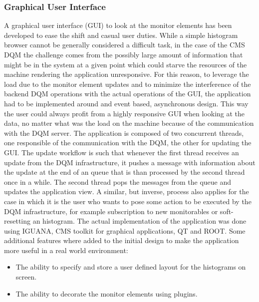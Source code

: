 \documentclass[a4paper]{cmspaper}
\begin{document}
\subsubsection{Graphical User Interface}
\label{sec:gui_client}
A graphical user interface (GUI) to look at the monitor elements has been developed to ease the shift and casual user duties. 
While a simple histogram browser cannot be generally considered a difficult task, in the case of the CMS DQM  the challenge comes from the possibly large amount of information that might be in the system at a given point which could starve the resources of the machine rendering the application unresponsive. 
For this reason, to leverage the load due to the monitor element updates and to minimize the interference of the backend DQM operations with the actual operations of the GUI, the application had to be implemented around and event based, asynchronous design.
This way the user could always profit from a highly responsive GUI when looking at the data, no matter what was the load on the machine because of the communication with the DQM server.
The application is composed of two concurrent threads, one responsible of the communication with the DQM, the other for updating the GUI. 
The update workflow is such that whenever the first thread receives an update from the DQM infrastructure, it pushes a message with information about the update at the end of an queue that is than processed by the second thread once in a while. The second thread pops the messages from the queue and updates the application view.
A similar, but inverse, process also applies for the case in which it is the user who wants to pose some action to be executed by the DQM infrastructure, for example subscription to new monitorables or soft-resetting an histogram.
The actual implementation of the application was done using IGUANA, CMS toolkit for graphical applications, QT and ROOT.
Some additional features where added to the initial design to make the application more useful in a real world environment:

\begin{itemize}
\item{The ability to specify and store a user defined layout for the histograms on screen.}
\item{The ability to decorate the monitor elements using plugins.}
\end{itemize}
\end{document}
